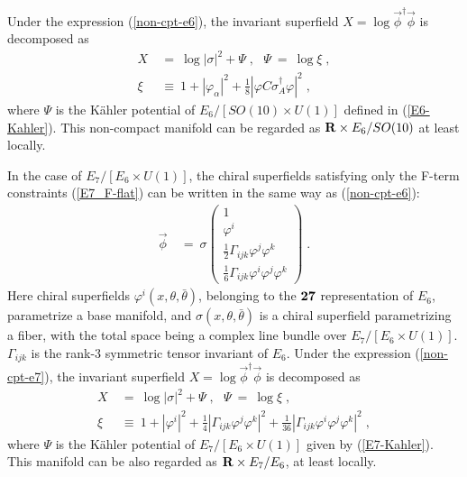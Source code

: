 \documentclass[a4paper,11pt]{article}
\newcommand{\kahler}{K\"{a}hler }
\newcommand{\bsubeq}{\begin{subequations}}
\newcommand{\esubeq}{\end{subequations}}
\begin{document}
{Under the expression (\ref{non-cpt-e6}), 
the invariant superfield $X = \log \vec{\phi}^{\dagger} \vec{\phi}$
is decomposed as
\bsubeq \label{xi-e6}
\begin{align}
X 
\ &= \
\log |\sigma|^2 + \Psi \; , \ \ \ 
\Psi \ = \ \log \xi \; , \\
\xi \ &\equiv \ 
1 + |\varphi_{\alpha}|^2 
+ \frac{1}{8} |\varphi C \sigma_A^{\dagger} \varphi|^2 \; ,
\end{align}
\esubeq
where $\Psi$ is the \kahler potential 
of $E_6 / [SO(10) \times U(1)]$ defined in (\ref{E6-Kahler}).
This non-compact manifold can be regarded as 
${\bf R} \times E_6 / SO(10)$ at least locally.

In the case of $E_7 / [E_6 \times U(1)]$, 
the chiral superfields satisfying only the F-term constraints 
(\ref{E7_F-flat}) can be written in the same way 
as (\ref{non-cpt-e6}):
\begin{align}
\vec{\phi} \ &= \ \sigma \left(
\begin{array}{c}
1 \\
\varphi^i \\
\frac{1}{2} \Gamma_{ijk} \varphi^j \varphi^k \\
\frac{1}{6} \Gamma_{ijk} \varphi^i \varphi^j \varphi^k
\end{array} \right) \; . \label{non-cpt-e7}
\end{align}
Here chiral superfields 
$\varphi^i (x , \theta , \bar{\theta})$, 
belonging to the ${\bf 27}$ representation of $E_6$,
parametrize a base manifold, 
and $\sigma (x , \theta, \bar{\theta})$ is a chiral superfield 
parametrizing a fiber, 
with the total space being 
a complex line bundle over $E_7 / [E_6 \times U(1)]$. 
$\Gamma_{ijk}$ is the rank-3 symmetric tensor invariant of $E_6$. 
Under the expression (\ref{non-cpt-e7}), 
the invariant superfield $X= \log \vec{\phi}^{\dagger} \vec{\phi}$
is decomposed as
\bsubeq \label{xi-e7}
\begin{align}
X \ &= \ 
\log |\sigma|^2 + \Psi \; , \ \ \ 
\Psi \ = \ \log \xi \; , \\
\xi \ &\equiv \ 
1 + |\varphi^i|^2 
+ \frac{1}{4} |\Gamma_{ijk} \varphi^j \varphi^k|^2 
+ \frac{1}{36} |\Gamma_{ijk} \varphi^i \varphi^j \varphi^k|^2 \; ,
\end{align}
\esubeq
where $\Psi$ is the \kahler potential of 
$E_7 / [E_6 \times U(1)]$ given by (\ref{E7-Kahler}).
This manifold can be also regarded as ${\bf R} \times E_7 / E_6$, 
at least locally.

}
\end{document}
